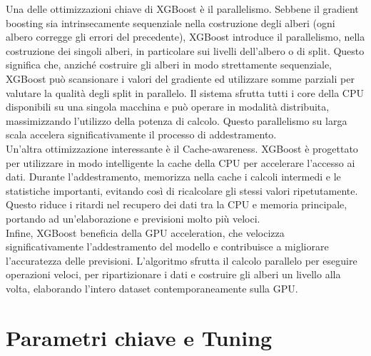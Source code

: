 \documentclass[a4paper,12pt]{report}
\begin{document}
	Una delle ottimizzazioni chiave di XGBoost è il parallelismo. Sebbene il gradient boosting sia intrinsecamente sequenziale nella costruzione degli alberi (ogni albero corregge gli errori del precedente), XGBoost introduce il parallelismo, nella costruzione dei singoli alberi, in particolare sui livelli dell'albero o di split. Questo significa che, anziché costruire gli alberi in modo strettamente sequenziale, XGBoost può scansionare i valori del gradiente ed utilizzare somme parziali per valutare la qualità degli split in parallelo. Il sistema sfrutta tutti i core della CPU disponibili su una singola macchina e può operare in modalità distribuita, massimizzando l'utilizzo della potenza di calcolo. Questo parallelismo su larga scala accelera significativamente il processo di addestramento. \\
	Un'altra ottimizzazione interessante è il Cache-awareness. XGBoost è progettato per utilizzare in modo intelligente la cache della CPU per accelerare l'accesso ai dati. Durante l'addestramento, memorizza nella cache i calcoli intermedi e le statistiche importanti, evitando così di ricalcolare gli stessi valori ripetutamente. Questo riduce i ritardi nel recupero dei dati tra la CPU e memoria principale, portando ad un'elaborazione e previsioni molto più veloci. \\
	Infine, XGBoost beneficia della GPU acceleration, che velocizza significativamente l'addestramento del modello e contribuisce a migliorare l'accuratezza delle previsioni. L'algoritmo sfrutta il calcolo parallelo per eseguire operazioni veloci, per ripartizionare i dati e costruire gli alberi un livello alla volta, elaborando l'intero dataset contemporaneamente sulla GPU. \\
	
	\section{Parametri chiave e Tuning}
	
\end{document}

